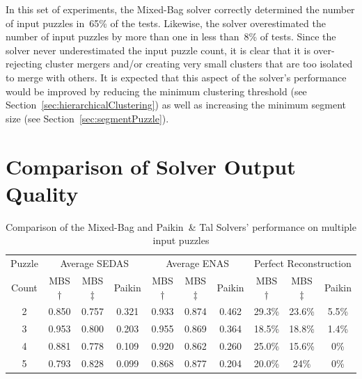 In this set of experiments, the Mixed-Bag solver correctly determined the number of input puzzles in~65\% of the tests.  Likewise, the solver overestimated the number of input puzzles by more than one in less than~8\% of tests.  Since the solver never underestimated the input puzzle count, it is clear that it is over-rejecting cluster mergers and/or creating very small clusters that are too isolated to merge with others.  It is expected that this aspect of the solver's performance would be improved by reducing the minimum clustering threshold (see Section~\ref{sec:hierarchicalClustering}) as well as increasing the minimum segment size (see Section~\ref{sec:segmentPuzzle}). 

\section{Comparison of Solver Output Quality}\label{sec:comparisonOfSolverOutputQuality}

\begin{table}[tb]
\begin{center}
\caption{Comparison of the Mixed-Bag and Paikin~\& Tal Solvers' performance on multiple input puzzles}\label{tab:tableSolverPerformanceComparison}
\begin{tabular}{ c||c|c|c||c|c|c||c|c|c } 
 \toprule
 Puzzle & \multicolumn{3}{c||}{Average SEDAS} & \multicolumn{3}{c||}{Average ENAS} & \multicolumn{3}{c}{Perfect Reconstruction} \\ \cline{2-10}
 Count & MBS$\dagger$ & MBS$\ddagger$ & Paikin & MBS$\dagger$ & MBS$\ddagger$ & Paikin & MBS$\dagger$ & MBS$\ddagger$ & Paikin \\ 
 \hline \hline
 
	2 & 0.850 & 0.757 & 0.321 & 0.933 & 0.874 & 0.462 & 29.3\% & 23.6\% & 5.5\% \\ \hline
 
	3 & 0.953 & 0.800 & 0.203 & 0.955 & 0.869 & 0.364 & 18.5\% & 18.8\% & 1.4\% \\ \hline
  
	4 & 0.881 & 0.778 & 0.109 & 0.920 & 0.862 & 0.260 & 25.0\% & 15.6\% & 0\% \\ \hline
  
	5 & 0.793 & 0.828 & 0.099 & 0.868 & 0.877 & 0.204 & 20.0\% & 24\% & 0\% \\ 
 \bottomrule
\end{tabular}
\end{center}
\end{table}

